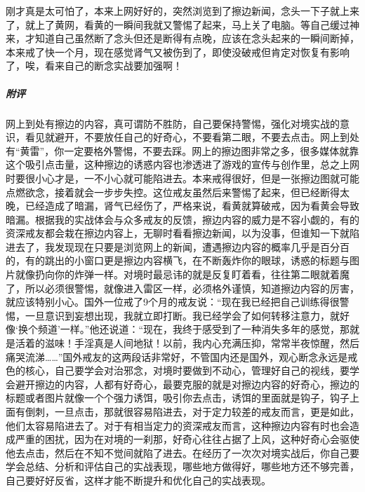 \begin{case}
    刚才真是太可怕了，本来上网好好的，突然浏览到了擦边新闻，念头一下子就上来了，就上了黄网，看黄的一瞬间我就又警惕了起来，马上关了电脑。等自己缓过神来，才知道自己虽然断了念头但还是断得有点晚，应该在念头起来的一瞬间断掉，本来戒了快一个月，现在感觉肾气又被伤到了，即使没破戒但肯定对恢复有影响了，唉，看来自己的断念实战要加强啊！
    \subparagraph{附评} 网上到处有擦边的内容，真可谓防不胜防，自己要保持警惕，强化对境实战的意识，看见就避开，不要放任自己的好奇心，不要看第二眼，不要去点击。网上到处有“黄雷”，你一定要格外警惕，不要去踩。网上的擦边图非常之多，很多媒体就靠这个吸引点击量，这种擦边的诱惑内容也渗透进了游戏的宣传与创作里，总之上网时要很小心才是，一不小心就可能陷进去。本来戒得很好，但是一张擦边图就可能点燃欲念，接着就会一步步失控。这位戒友虽然后来警惕了起来，但已经断得太晚，已经造成了暗漏，肾气已经伤了，严格来说，看黄就算破戒，因为看黄会导致暗漏。根据我的实战体会与众多戒友的反馈，擦边内容的威力是不容小觑的，有的资深戒友都会栽在擦边内容上，无聊时看看擦边新闻，以为没事，但谁知一下就陷进去了，我发现现在只要是浏览网上的新闻，遭遇擦边内容的概率几乎是百分百的，有的跳出的小窗口更是擦边内容横飞，在不断轰炸你的眼球，诱惑的标题与图片就像扔向你的炸弹一样。对境时最忌讳的就是反复盯着看，往往第二眼就着魔了，所以必须很警惕，就像进入雷区一样，必须格外谨慎，知道擦边内容的厉害，就应该特别小心。国外一位戒了9个月的戒友说：“现在我已经把自己训练得很警惕，一旦意识到妄想出现，我就立即打断。我已经学会了如何转移注意力，就好像‘换个频道’一样。”他还说道：“现在，我终于感受到了一种消失多年的感觉，那就是活着的滋味！手淫真是人间地狱！以前，我内心充满压抑，常常半夜惊醒，然后痛哭流涕……”国外戒友的这两段话非常好，不管国内还是国外，观心断念永远是戒色的核心，自己要学会对治邪念，对境时要做到不动心，管理好自己的视线，要学会避开擦边的内容，人都有好奇心，最要克服的就是对擦边内容的好奇心，擦边的标题或者图片就像一个个强力诱饵，吸引你去点击，诱饵的里面就是钩子，钩子上面有倒刺，一旦点击，那就很容易陷进去，对于定力较差的戒友而言，更是如此，他们太容易陷进去了。对于有相当定力的资深戒友而言，这种擦边内容有时也会造成严重的困扰，因为在对境的一刹那，好奇心往往占据了上风，这种好奇心会驱使他去点击，然后在不知不觉间就陷了进去。在经历了一次次对境实战后，你自己要学会总结、分析和评估自己的实战表现，哪些地方做得好，哪些地方还不够完善，自己要好好反省，这样才能不断提升和优化自己的实战表现。
\end{case}


